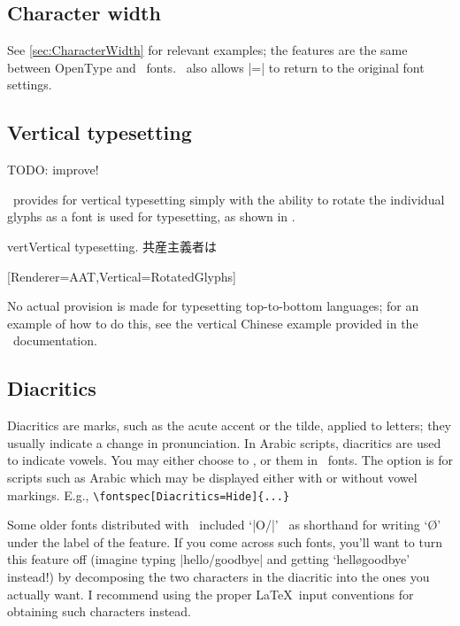 \subsection{Character width}
See \vref{sec:CharacterWidth} for relevant examples; the features are
the same between OpenType and \AAT\ fonts.
\AAT\ also allows |=| to return to
the original font settings.







\subsection{Vertical typesetting}

TODO: improve!

\XeTeX\ provides for vertical typesetting simply with the ability to rotate
the individual glyphs as a font is used for typesetting, as shown in
.

\begin{Xexample}[firstline=2]{vert}{Vertical typesetting.}
  \def\verttext{共産主義者は}
  \verttext

  [Renderer=AAT,Vertical=RotatedGlyphs]
  \rotatebox{-90}{\verttext}%
\end{Xexample}

No actual provision is made for typesetting top-to-bottom
languages; for an example of how to do this, see the vertical Chinese
example provided in the \XeTeX\ documentation.




\subsection{Diacritics}
Diacritics are marks, such as the acute accent or the tilde, applied to letters; they usually indicate a change in pronunciation.
In Arabic scripts, diacritics are used to indicate vowels.
You may either choose
to ,  or  them in \AAT\ fonts.
The  option is for scripts such as Arabic which may be
displayed either with or without vowel markings. E.g.,
\verb|\fontspec[Diacritics=Hide]{...}|

Some older fonts distributed with \MacOSX\ included `|O/|' \etc\ as shorthand for writing `\O' under the label of the  feature. If you come across such fonts, you'll
want to turn this feature off (imagine typing |hello/goodbye| and
getting `hell\o goodbye' instead!) by decomposing the two characters
in the diacritic into the ones you actually
want. I recommend using
the proper \LaTeX\ input conventions for obtaining such characters
instead.




